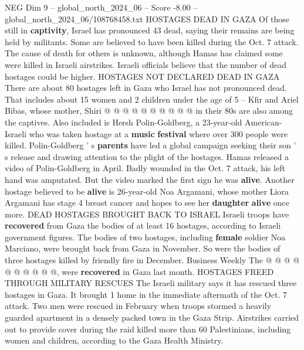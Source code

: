 \begin{textsample}{NEG Dim 9 – global\_north\_2024\_06 – Score -8.00 – global\_north\_2024\_06/108768458.txt}
HOSTAGES DEAD IN GAZA Of those still in \textbf{captivity}, Israel has pronounced 43 dead, saying their remains are being held by militants.
Some are believed to have been killed during the Oct. 7 attack.
The cause of death for others is unknown, although Hamas has claimed some were killed in Israeli airstrikes.
Israeli officials believe that the number of dead hostages could be higher.
HOSTAGES NOT DECLARED DEAD IN GAZA There are about 80 hostages left in Gaza who Israel has not pronounced dead.
That includes about 15 women and 2 children under the age of 5 -- Kfir and Ariel Bibas, whose mother, Shiri @ @ @ @ @ @ @ @ @ @ in their 80s are also among the captives.
Also included is Hersh Polin-Goldberg, a 23-year-old American-Israeli who was taken hostage at a \textbf{music} \textbf{festival} where over 300 people were killed.
Polin-Goldberg ' s \textbf{parents} have led a global campaign seeking their son ' s release and drawing attention to the plight of the hostages.
Hamas released a video of Polin-Goldberg in April.
Badly wounded in the Oct. 7 attack, his left hand was amputated.
But the video marked the first sign he was \textbf{alive}.
Another hostage believed to be \textbf{alive} is 26-year-old Noa Argamani, whose mother Liora Argamani has stage 4 breast cancer and hopes to see her \textbf{daughter} \textbf{alive} once more.
DEAD HOSTAGES BROUGHT BACK TO ISRAEL Israeli troops have \textbf{recovered} from Gaza the bodies of at least 16 hostages, according to Israeli government figures.
The bodies of two hostages, including \textbf{female} soldier Noa Marciano, were brought back from Gaza in November.
So were the bodies of three hostages killed by friendly fire in December.
Business Weekly The @ @ @ @ @ @ @ @ @ @, were \textbf{recovered} in Gaza last month.
HOSTAGES FREED THROUGH MILITARY RESCUES The Israeli military says it has rescued three hostages in Gaza.
It brought 1 home in the immediate aftermath of the Oct. 7 attack.
Two men were rescued in February when troops stormed a heavily guarded apartment in a densely packed town in the Gaza Strip.
Airstrikes carried out to provide cover during the raid killed more than 60 Palestinians, including women and children, according to the Gaza Health Ministry.

\end{textsample}
